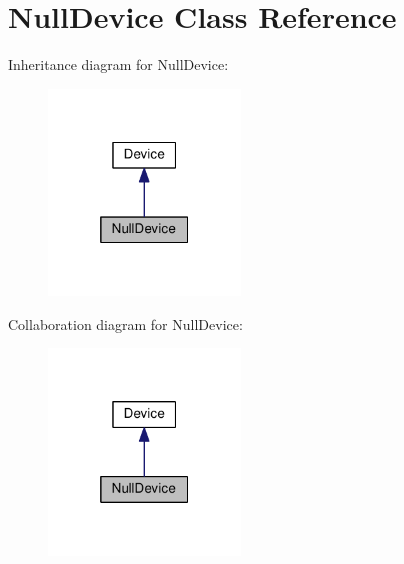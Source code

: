 \hypertarget{class_null_device}{}\section{Null\+Device Class Reference}
\label{class_null_device}


Inheritance diagram for Null\+Device\+:\nopagebreak
\begin{figure}[H]
\begin{center}
\leavevmode
\includegraphics[width=145pt]{class_null_device__inherit__graph}
\end{center}
\end{figure}


Collaboration diagram for Null\+Device\+:\nopagebreak
\begin{figure}[H]
\begin{center}
\leavevmode
\includegraphics[width=145pt]{class_null_device__coll__graph}
\end{center}
\end{figure}
